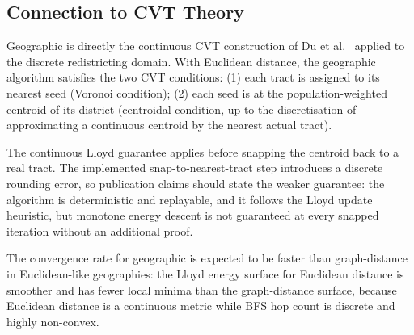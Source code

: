 \subsection{Connection to CVT Theory}

Geographic \cvd{} is directly the continuous CVT construction of
Du et al.~\citeyear{du1999} applied to the discrete redistricting domain.
With Euclidean distance, the geographic algorithm satisfies the two CVT conditions:
(1) each tract is assigned to its nearest seed (Voronoi condition);
(2) each seed is at the population-weighted centroid of its district
(centroidal condition, up to the discretisation of approximating a continuous
centroid by the nearest actual tract).

The continuous Lloyd guarantee applies before snapping the centroid back to a
real tract.  The implemented snap-to-nearest-tract step introduces a discrete
rounding error, so publication claims should state the weaker guarantee: the
algorithm is deterministic and replayable, and it follows the Lloyd update
heuristic, but monotone energy descent is not guaranteed at every snapped
iteration without an additional proof.

The convergence rate for geographic \cvd{} is expected to be faster than graph-distance \cvd{} in
Euclidean-like geographies: the Lloyd energy surface for Euclidean distance
is smoother and has fewer local minima than the graph-distance surface,
because Euclidean distance is a continuous metric while BFS hop count is
discrete and highly non-convex.
